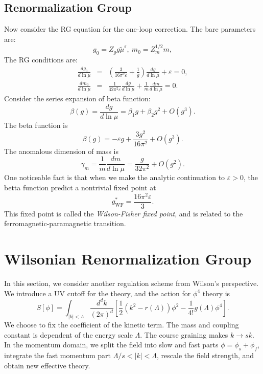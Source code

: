 \documentclass[aps,prb,superscriptaddress,nofootinbib]{revtex4}
\begin{document}
\subsection{Renormalization Group}
Now consider the RG equation for the one-loop correction. 
The bare parameters are:
\begin{equation}
	g_0 = Z_g g\tilde{\mu}^{\varepsilon},\ 
	m_0 = Z_m^{1/2} m,
\end{equation}
The RG conditions are:
\begin{eqnarray}
	\frac{d g_0}{d\ln \mu}
	&=& \left(\frac{3}{16\pi^2 \varepsilon} + \frac{1}{g}\right)\frac{dg}{d\ln \mu} + \varepsilon = 0, \\
	\frac{d m_0}{d\ln \mu}
	&=& \frac{1}{32\pi^2 \varepsilon}\frac{dg}{d\ln \mu} + \frac{1}{m}\frac{dm}{d \ln \mu} = 0.
\end{eqnarray}
Consider the series expansion of beta function:
\begin{equation}
	\beta(g) = \frac{dg}{d\ln \mu} = \beta_1 g + \beta_2 g^2 +O(g^3).
\end{equation}
The beta function is
\begin{equation}
	\beta(g) = -\varepsilon g + \frac{3g^2}{16\pi^2} + O(g^3).
\end{equation}
The anomalous dimension of mass is
\begin{equation}
	\gamma_m = \frac{1}{m}\frac{dm}{d \ln \mu} = \frac{g}{32\pi^2}+O(g^2).
\end{equation}
One noticeable fact is that when we make the analytic continuation to $\varepsilon>0$, the betta function predict a nontrivial fixed point at
\begin{equation}
	g^*_{\mathrm{WF}} = \frac{16\pi^2 \varepsilon}{3}.
\end{equation}
This fixed point is called the \textit{Wilson-Fisher fixed point}, and is related to the ferromagnetic-paramagnetic transition.



\section{Wilsonian Renormalization Group}

In this section, we consider another regulation scheme from Wilson's perspective.
We introduce a UV cutoff for the theory, and the action for $\phi^4$ theory is
\begin{equation}
	S[\phi] = \int_{|k|<\Lambda} \frac{d^d k}{(2\pi)^d}\left[\frac{1}{2} \left(k^2-r(\Lambda)\right)\phi^2 - \frac{1}{4!}g(\Lambda)\phi^4\right].
\end{equation}
We choose to fix the coefficient of the kinetic term.
The mass and coupling constant is dependent of the energy scale $\Lambda$.
The course graining makes $k \rightarrow s k$.
In the momentum domain, we split the field into slow and fast parts $\phi = \phi_{s} + \phi_{f}$, integrate the fast momentum part $\Lambda/s<|k|<\Lambda$, rescale the field strength, and obtain new effective theory.
\end{document}
